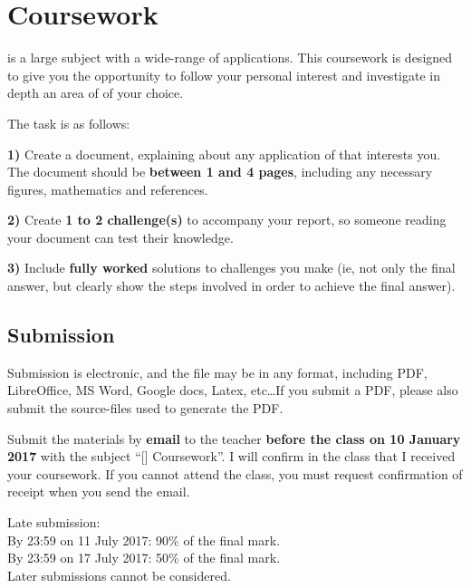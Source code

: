\newpage
\section{Coursework}
\course is a large subject with a wide-range of applications. This coursework is designed to give you the opportunity to follow your personal interest and investigate in depth an area of \course of your choice.

The task is as follows:

\textbf{1)} Create a document, explaining about any application of \course that interests you. The document should be \textbf{between 1 and 4 pages}, including any necessary figures, mathematics and references.

\textbf{2)} Create \textbf{1 to 2 challenge(s)} to accompany your report, so someone reading your document can test their knowledge.

\textbf{3)} Include \textbf{fully worked} solutions to challenges you make (ie, not only the final answer, but clearly show the steps involved in order to achieve the final answer).

\subsection{Submission}
Submission is electronic, and the file may be in any format, including PDF, LibreOffice, MS Word, Google docs, Latex, etc\ldots If you submit a PDF, please also submit the source-files used to generate the PDF.

Submit the materials by \textbf{email} to the teacher \textbf{before the class on 10 January 2017} with the subject ``[\coursenospace] Coursework''. I will confirm in the class that I received your coursework. If you cannot attend the class, you must request confirmation of receipt when you send the email.

Late submission:\\
By 23:59 on 11 July 2017: 90\% of the final mark.\\
By 23:59 on 17 July 2017: 50\% of the final mark.\\
Later submissions cannot be considered.


